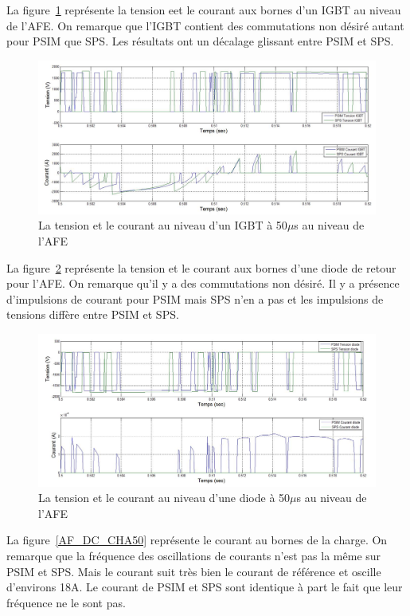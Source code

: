 \documentclass[11pt,letterpaper,final]{report}
\begin{document}
La figure~\ref{AF_DC_IGBT50} représente la tension eet le courant aux bornes d'un IGBT au niveau de l'AFE. On remarque que l'IGBT contient des commutations non désiré autant pour PSIM que SPS. Les résultats ont un décalage glissant entre PSIM et SPS. 

\begin{figure}[htb]
\centering
\includegraphics[scale=0.5]{Fig/DCP_AFE/50u/IGBT_afe.jpg}
\caption{La tension et le courant au niveau d'un IGBT à 50$\mu$s au niveau de l'AFE}
\label{AF_DC_IGBT50}
\end{figure}

La figure~\ref{AF_DC_DI50} représente la tension et le courant aux bornes d'une diode de retour pour l'AFE. On remarque qu'il y a des commutations non désiré. Il y a présence d'impulsions de courant pour PSIM mais SPS n'en a pas et les impulsions de tensions diffère entre PSIM et SPS.

\begin{figure}[htb]
\centering
\includegraphics[scale=0.5]{Fig/DCP_AFE/50u/ten_diode_afe.jpg}
\caption{La tension et le courant au niveau d'une diode à 50$\mu$s au niveau de l'AFE}
\label{AF_DC_DI50}
\end{figure}

La figure~\ref{AF_DC_CHA50} représente le courant au bornes de la charge. On remarque que la fréquence des oscillations de courants n'est pas la même sur PSIM et SPS. Mais le courant suit très bien le courant de référence et oscille d'environs 18A. Le courant de PSIM et SPS sont identique à part le fait que leur fréquence ne le sont pas.
\end{document}
